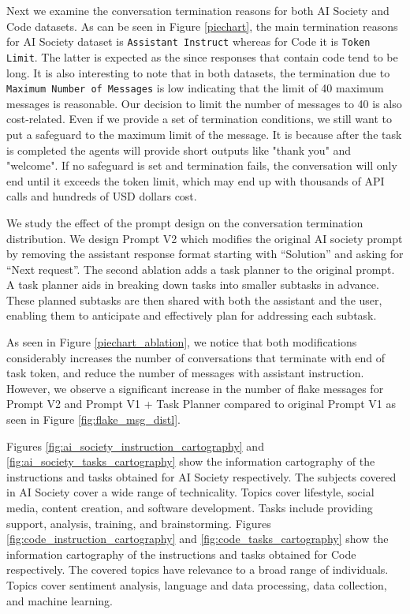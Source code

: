 Next we examine the conversation termination reasons for both AI Society and Code datasets. As can be seen in Figure \ref{piechart}, the main termination reasons for AI Society dataset is \texttt{Assistant Instruct} whereas for Code it is \texttt{Token Limit}. The latter is expected as the since responses that contain code tend to be long. It is also interesting to note that in both datasets, the termination due to \texttt{Maximum Number of Messages} is low indicating that the limit of 40 maximum messages is reasonable. Our decision to limit the number of messages to 40 is also cost-related. Even if we provide a set of termination conditions, we still want to put a safeguard to the maximum limit of the message. It is because after the task is completed the agents will provide short outputs like "thank you" and "welcome". If no safeguard is set and termination fails, the conversation will only end until it exceeds the token limit, which may end up with thousands of API calls and hundreds of USD dollars cost.

We study the effect of the prompt design on the conversation termination distribution. We design Prompt V2 which modifies the original AI society prompt by removing the assistant response format \ie starting with “Solution” and asking for “Next request”. The second ablation adds a task planner to the original prompt. A task planner aids in breaking down tasks into smaller subtasks in advance. These planned subtasks are then shared with both the assistant and the user, enabling them to anticipate and effectively plan for addressing each subtask.

As seen in Figure \ref{piechart_ablation}, we notice that both modifications considerably increases the number of conversations that terminate with end of task token, and reduce the number of messages with assistant instruction. However, we observe a significant increase in the number of flake messages for Prompt V2 and Prompt V1 + Task Planner compared to original Prompt V1 as seen in Figure \ref{fig:flake_msg_distl}.

Figures \ref{fig:ai_society_instruction_cartography} and \ref{fig:ai_society_tasks_cartography} show the information cartography of the instructions and tasks obtained for AI Society respectively. The subjects covered in AI Society cover a wide range of technicality. Topics cover lifestyle, social media, content creation, and software development. Tasks include providing support, analysis, training, and brainstorming. Figures \ref{fig:code_instruction_cartography} and \ref{fig:code_tasks_cartography} show the information cartography of the instructions and tasks obtained for Code respectively. The covered topics have relevance to a broad range of individuals. Topics cover sentiment analysis, language and data processing, data collection, and machine learning.

